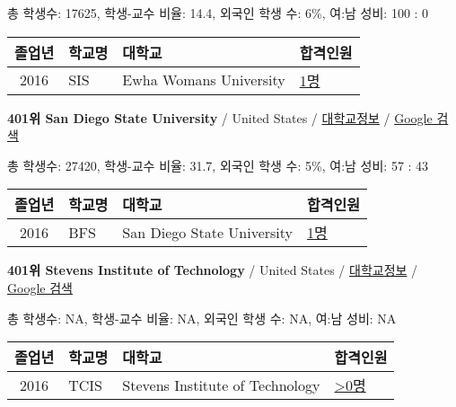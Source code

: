 \documentclass[13pt,]{article}
\begin{document}
총 학생수: 17625, 학생-교수 비율: 14.4, 외국인 학생 수: 6\%, 여:남 성비:
100 : 0

\begin{longtable}[]{@{}clll@{}}
\toprule
졸업년 & 학교명 & 대학교 & 합격인원\tabularnewline
\midrule
\endhead
2016 & SIS & Ewha Womans University &
\href{http://cafe.naver.com/assarabia/11589}{1명}\tabularnewline
\bottomrule
\end{longtable}

\textbf{401위 San Diego State University} / United States /
\href{https://www.timeshighereducation.com/world-university-rankings/san-diego-state-university?ranking-dataset=589595}{대학교정보}
/
\href{http://www.google.com/search?q=San+Diego+State+University}{Google
검색}

총 학생수: 27420, 학생-교수 비율: 31.7, 외국인 학생 수: 5\%, 여:남 성비:
57 : 43

\begin{longtable}[]{@{}clll@{}}
\toprule
졸업년 & 학교명 & 대학교 & 합격인원\tabularnewline
\midrule
\endhead
2016 & BFS & San Diego State University &
\href{http://cafe.naver.com/assarabia/11597}{1명}\tabularnewline
\bottomrule
\end{longtable}

\textbf{401위 Stevens Institute of Technology} / United States /
\href{https://www.timeshighereducation.com/world-university-rankings/stevens-institute-technology?ranking-dataset=589595}{대학교정보}
/
\href{http://www.google.com/search?q=Stevens+Institute+of+Technology}{Google
검색}

총 학생수: NA, 학생-교수 비율: NA, 외국인 학생 수: NA, 여:남 성비: NA

\begin{longtable}[]{@{}clll@{}}
\toprule
졸업년 & 학교명 & 대학교 & 합격인원\tabularnewline
\midrule
\endhead
2016 & TCIS & Stevens Institute of Technology &
\href{http://cafe.naver.com/assarabia/11598}{\textgreater{}0명}\tabularnewline
\bottomrule
\end{longtable}
\end{document}
